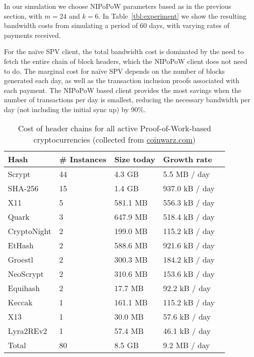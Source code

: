  In our simulation we choose NIPoPoW parameters based as in the previous section, with $m=24$ and $k=6$.
In Table~\ref{tbl:experiment} we show the resulting bandwidth costs from simulating a period of 60 days, with varying rates of payments received.

 For the na\"ive SPV client, the total bandwidth cost is dominated by the need to fetch the entire chain of block headers, which the NIPoPoW client does not need to do. The marginal cost for na\"ive SPV depends on the number of blocks generated each day, as well as the transaction inclusion proofs associated with each payment. The NIPoPoW based client provides the most savings when the number of transactions per day is smallest, reducing the necessary bandwidth per day (not including the initial sync up) by 90\%.

\begin{table}
  \caption{Cost of header chains for all active Proof-of-Work-based cryptocurrencies (collected from \url{coinwarz.com})}
  \label{tbl:currencies}
  \small
  \centering
  \begin{tabular}{l|l|l|l}
    {\bf Hash} & {\bf \# Instances} & {\bf Size today} & {\bf Growth rate}  \\
    \hline
    Scrypt  & 44  & 4.3 GB  & 5.5 MB / day \  \\
    SHA-256  & 15  & 1.4 GB  & 937.0 kB / day \  \\
    X11  & 5  & 581.1 MB  & 556.3 kB / day \  \\
    Quark  & 3  & 647.9 MB  & 518.4 kB / day \  \\
    CryptoNight  & 2  & 199.0 MB  & 115.2 kB / day \  \\
    EtHash  & 2  & 588.6 MB  & 921.6 kB / day \  \\
    Groestl  & 2  & 300.3 MB  & 184.2 kB / day \  \\
    NeoScrypt  & 2  & 310.6 MB  & 153.6 kB / day \  \\
    Equihash  & 2  & 17.7 MB  & 92.2 kB / day \  \\
    Keccak  & 1  & 161.1 MB  & 115.2 kB / day \  \\
    X13  & 1  & 30.0 MB  & 57.6 kB / day \  \\
    Lyra2REv2  & 1  & 57.4 MB  & 46.1 kB / day \  \\
    \hline
    Total  & 80   &  8.5 GB  & 9.2 MB  / day  \\
  \end{tabular}
\end{table}




